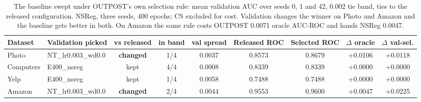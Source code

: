 \begin{table}[t]
\centering
\small
\begin{tabular}{llccccccc}
\toprule
Dataset & Validation picked & vs released & in band & val spread & Released ROC & Selected ROC & $\Delta$ oracle & $\Delta$ val-sel. \\
\midrule
Photo & NT\_lr0.003\_wd0.0 & \textbf{changed} & 1/4 & 0.0037 & 0.8573 & 0.8679 & +0.0106 & +0.0118 \\
Computers & E400\_nsreg & kept & 4/4 & 0.0008 & 0.8339 & 0.8339 & +0.0000 & +0.0000 \\
Yelp & E400\_nsreg & kept & 1/4 & 0.0058 & 0.7488 & 0.7488 & +0.0000 & +0.0000 \\
Amazon & NT\_lr0.003\_wd0.0 & \textbf{changed} & 2/4 & 0.0044 & 0.9553 & 0.9600 & +0.0047 & +0.0225 \\
\bottomrule
\end{tabular}
\caption{The baseline swept under OUTPOST's own selection rule: mean validation AUC over seeds 0, 1 and 42, 0.002 tie band, ties to the released configuration. NSReg, three seeds, 400 epochs; CS excluded for cost. Validation changes the winner on Photo and Amazon and the baseline gets better in both. On Amazon the same rule costs OUTPOST 0.0071 oracle AUC-ROC and hands NSReg 0.0047.}
\label{tab:baselinesel}
\end{table}
